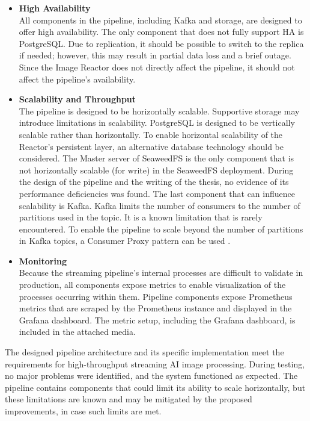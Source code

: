 \begin{itemize}
    \item \textbf{High Availability} \\
    All components in the pipeline, including Kafka and storage, are designed to offer high availability. The only component that does not fully support HA is PostgreSQL. Due to replication, it should be possible to switch to the replica if needed; however, this may result in partial data loss and a brief outage. Since the Image Reactor does not directly affect the pipeline, it should not affect the pipeline's availability.
    \item \textbf{Scalability and Throughput} \\
    The pipeline is designed to be horizontally scalable. Supportive storage may introduce limitations in scalability. PostgreSQL is designed to be vertically scalable rather than horizontally. To enable horizontal scalability of the Reactor's persistent layer, an alternative database technology should be considered. The Master server of SeaweedFS is the only component that is not horizontally scalable (for write) in the SeaweedFS deployment. During the design of the pipeline and the writing of the thesis, no evidence of its performance deficiencies was found. The last component that can influence scalability is Kafka. Kafka limits the number of consumers to the number of partitions used in the topic. It is a known limitation that is rarely encountered. To enable the pipeline to scale beyond the number of partitions in Kafka topics, a Consumer Proxy pattern can be used \cite{yang_enabling_2021}.
    \item \textbf{Monitoring} \\
    Because the streaming pipeline's internal processes are difficult to validate in production, all components expose metrics to enable visualization of the processes occurring within them. Pipeline components expose Prometheus metrics that are scraped by the Prometheus instance and displayed in the Grafana dashboard. The metric setup, including the Grafana dashboard, is included in the attached media.
\end{itemize}

The designed pipeline architecture and its specific implementation meet the requirements for high-throughput streaming AI image processing. During testing, no major problems were identified, and the system functioned as expected. The pipeline contains components that could limit its ability to scale horizontally, but these limitations are known and may be mitigated by the proposed improvements, in case such limits are met.